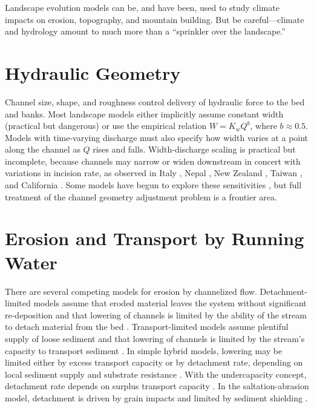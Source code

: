 \documentclass[12pt,reqno]{amsart}
\begin{document}
Landscape evolution models can be, and have been, used to study climate impacts on erosion, topography, and mountain building. But be careful---climate and hydrology amount to much more than a ``sprinkler over the landscape.''

\section{Hydraulic Geometry}

Channel size, shape, and roughness control delivery of hydraulic force
to the bed and banks. Most landscape models either implicitly assume
constant width (practical but dangerous) or use the empirical relation
$W = K_w Q^b$, where $b\approx 0.5$. Models with time-varying
discharge must also specify how width varies at a point along the
channel as $Q$ rises and falls. Width-discharge scaling is practical
but incomplete, because channels may narrow or widen downstream in
concert with variations in incision rate, as observed in Italy
\citep{whittaker2007bedrock}, Nepal \citep{lave2001fluvial}, New Zealand
\citep{amos2007channel}, Taiwan \citep{yanites2010incision}, and California \citep{duvall2004tectonic}. Some
models have begun to explore these sensitivities \citep{wobus2006self,wobus2008modeling,attal2008modeling,turowski2009response,yanites2010controls},
but full treatment of the channel geometry adjustment problem is a frontier area.

\section{Erosion and Transport by Running Water}

There are several competing models for erosion by channelized flow. Detachment-limited models
assume that eroded material leaves the system without significant
re-deposition and that lowering of channels is limited by the ability
of the stream to detach material from the bed \citep{howard1994detachment,whipple1999dynamics}. Transport-limited
models assume plentiful supply of loose sediment and that lowering of
channels is limited by the stream's capacity to transport
sediment \citep{willgoose1991coupled,whipple2002implications}. In simple hybrid models, lowering may be limited either by
excess transport capacity or by detachment rate, depending on local
sediment supply and substrate resistance
\citep{tucker2001channel,whipple2002implications}. With the undercapacity
concept, detachment rate depends on surplus transport capacity \citep{beaumont1992erosional}.
In the saltation-abrasion model, detachment is driven by grain impacts
and limited by sediment shielding \citep{gasparini2007predictions,whipple2002implications}.
\end{document}
